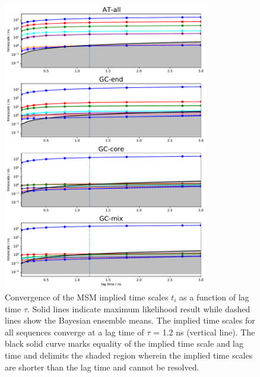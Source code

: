 \documentclass[journal=jpcbfk,manuscript=article]{achemso}
\begin{document}
\clearpage
\newpage

\begin{figure}[ht!]
	\centering
    \includegraphics[width=0.8\textwidth]{FigS2.pdf}
    \caption{Convergence of the MSM implied time scales $t_i$ as a function of lag time $\tau$. Solid lines indicate maximum likelihood result while dashed lines show the Bayesian ensemble means. The implied time scales for all sequences converge at a lag time of $\tau$ = 1.2 ns (vertical line). The black solid curve marks equality of the implied time scale and lag time and delimits the shaded region wherein the implied time scales are shorter than the lag time and cannot be resolved.}
    \label{fig:SIFig2}
\end{figure}

\clearpage
\newpage
\end{document}
